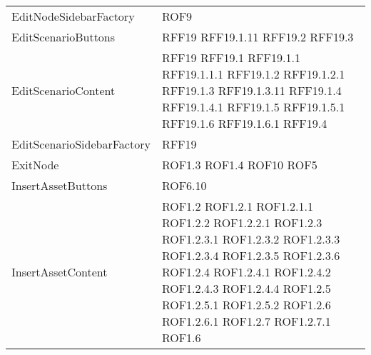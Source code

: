 \begin{longtable}{p{5cm}!{\VRule[1pt]}p{2.5cm}}
	EditNodeSidebarFactory & ROF9\\
	EditScenarioButtons & RFF19 \newline RFF19.1.11 \newline RFF19.2 \newline RFF19.3\\
	EditScenarioContent & RFF19 \newline RFF19.1 \newline RFF19.1.1 \newline RFF19.1.1.1 \newline RFF19.1.2 \newline RFF19.1.2.1 \newline RFF19.1.3 \newline RFF19.1.3.11 \newline RFF19.1.4 \newline RFF19.1.4.1 \newline RFF19.1.5 \newline RFF19.1.5.1 \newline RFF19.1.6 \newline RFF19.1.6.1 \newline RFF19.4\\
	EditScenarioSidebarFactory & RFF19\\
	ExitNode & ROF1.3 \newline ROF1.4 \newline ROF10 \newline ROF5\\
	InsertAssetButtons & ROF6.10\\
	InsertAssetContent & ROF1.2 \newline ROF1.2.1 \newline ROF1.2.1.1 \newline ROF1.2.2 \newline ROF1.2.2.1 \newline ROF1.2.3 \newline ROF1.2.3.1 \newline ROF1.2.3.2 \newline ROF1.2.3.3 \newline ROF1.2.3.4 \newline ROF1.2.3.5 \newline ROF1.2.3.6 \newline ROF1.2.4 \newline ROF1.2.4.1 \newline ROF1.2.4.2 \newline ROF1.2.4.3 \newline ROF1.2.4.4 \newline ROF1.2.5 \newline ROF1.2.5.1 \newline ROF1.2.5.2 \newline ROF1.2.6 \newline ROF1.2.6.1 \newline ROF1.2.7 \newline ROF1.2.7.1 \newline ROF1.6\\

\end{longtable}
